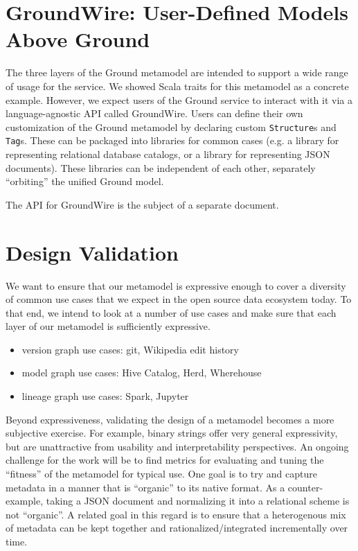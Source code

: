 \documentclass{article}
\newcommand{\structure}{\texttt{Structure}\xspace}
\newcommand{\tag}{\texttt{Tag}\xspace}
\newcommand{\versiongraph}{version graph\xspace}
\newcommand{\modelgraph}{model graph\xspace}
\newcommand{\lineagegraph}{lineage graph\xspace}
\newcommand{\groundwire}{GroundWire\xspace}
\begin{document}
\section{\groundwire: User-Defined Models Above Ground}
The three layers of the Ground metamodel are intended to support a wide range of usage for the service.  We 
showed Scala traits for this metamodel as a concrete example.  However, we expect users of the Ground
service to interact with it via a language-agnostic API called \groundwire.  Users can define their own
customization of the Ground metamodel by declaring custom {\structure}s and {\tag}s.  
These can be packaged into libraries for common cases (e.g. a library for representing
relational database catalogs, or a library for representing JSON documents).  These libraries can 
be independent of each other, separately ``orbiting'' the unified Ground model.  

The API for \groundwire is the subject of a separate document.

\section{Design Validation}
We want to ensure that our metamodel is expressive enough to cover a diversity of common use cases that we expect in the open source data ecosystem today.  
To that end, we intend to look at a number of use cases and make sure that each layer of our metamodel is sufficiently expressive. 


\begin{itemize}
\item \versiongraph use cases: git, Wikipedia edit history

\item \modelgraph use cases: Hive Catalog, Herd, Wherehouse

\item \lineagegraph use cases: Spark, Jupyter
\end{itemize}

Beyond expressiveness, validating the design of a metamodel becomes a more subjective exercise.  For example, binary strings offer very general expressivity, but are unattractive from usability and interpretability perspectives.  An ongoing challenge for the work will be to find metrics for evaluating and tuning the ``fitness'' of the metamodel for typical use.  One goal is to try and capture metadata in a manner that is ``organic'' to its native format.  As a counter-example, taking a JSON document and normalizing it into a relational scheme is not ``organic''. A related goal in this regard is to ensure that a heterogenous mix of metadata can be kept together and rationalized/integrated incrementally over time.
\end{document}
